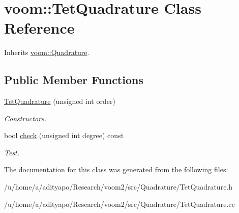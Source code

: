 \hypertarget{classvoom_1_1_tet_quadrature}{
\section{voom::TetQuadrature Class Reference}
\label{classvoom_1_1_tet_quadrature}
}


Inherits \hyperlink{classvoom_1_1_quadrature}{voom::Quadrature}.\subsection*{Public Member Functions}
\begin{DoxyCompactItemize}
\item 
\hypertarget{classvoom_1_1_tet_quadrature_afb15d49b3ab9b74e3e2cfb578df01edd}{
\hyperlink{classvoom_1_1_tet_quadrature_afb15d49b3ab9b74e3e2cfb578df01edd}{TetQuadrature} (unsigned int order)}
\label{classvoom_1_1_tet_quadrature_afb15d49b3ab9b74e3e2cfb578df01edd}

\begin{DoxyCompactList}\small\item\em Constructors. \item\end{DoxyCompactList}\item 
\hypertarget{classvoom_1_1_tet_quadrature_ace08644853d3635368344c9eeda1072f}{
bool \hyperlink{classvoom_1_1_tet_quadrature_ace08644853d3635368344c9eeda1072f}{check} (unsigned int degree) const }
\label{classvoom_1_1_tet_quadrature_ace08644853d3635368344c9eeda1072f}

\begin{DoxyCompactList}\small\item\em Test. \item\end{DoxyCompactList}\end{DoxyCompactItemize}


The documentation for this class was generated from the following files:\begin{DoxyCompactItemize}
\item 
/u/home/a/adityapo/Research/voom2/src/Quadrature/TetQuadrature.h\item 
/u/home/a/adityapo/Research/voom2/src/Quadrature/TetQuadrature.cc\end{DoxyCompactItemize}
